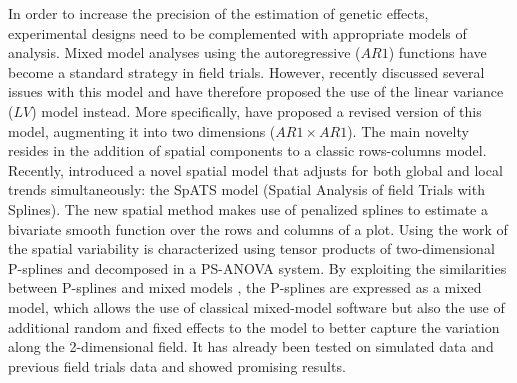 In order to increase the precision of the estimation of genetic effects, experimental designs need to be complemented with appropriate models of analysis. Mixed model analyses using the autoregressive ($AR1$) functions   \parencite{cullis_spatial_1991} have become a standard strategy in field trials. 
However, \textcite{piepho_problems_2015} recently discussed several issues with this model and have therefore proposed the use of the linear variance ($LV$) model \parencite{williams_use_1988} instead. More specifically, \textcite{piepho_linear_2010} have proposed a revised version of this model, augmenting it into two dimensions ($AR1 \times AR1$). The main novelty resides in the addition of spatial components to a classic rows-columns model. Recently, 
\textcite{rodriguez-alvarez_correcting_2018} introduced a novel spatial model that adjusts for both global and local trends simultaneously: the SpATS model (Spatial Analysis of field Trials with Splines). The new spatial method makes use of penalized splines \parencite{eilers_flexible_1996} to estimate a bivariate smooth function over the rows and columns of a plot. Using the work of \textcite{lee_efficient_2013,lee_hwang_smoothing_2010,lee_p-spline_2011} the spatial variability is characterized using tensor products of two-dimensional P-splines \parencite{dierckx_curve_1995} and decomposed in a PS-ANOVA system. By exploiting the similarities between P-splines and mixed models \parencite{currie_flexible_2002,durban_adjusting_2001, wand_smoothing_2003}, the P-splines are expressed as a mixed model, which allows the use of classical mixed-model software but also the use of additional random and fixed effects to the model to better capture the variation along the 2-dimensional field.
It has already been tested on simulated data \parencite{rodriguez-alvarez_correcting_2018} and previous field trials data \parencite{lado_increased_2013} and showed promising results.\\

